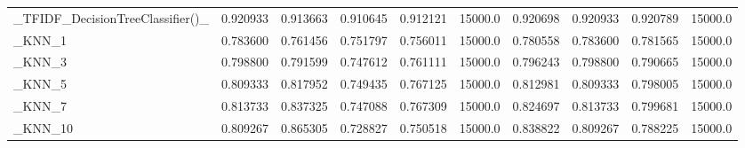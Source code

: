 \begin{tabular}{lrrrrrrrrr}
\_TFIDF\_DecisionTreeClassifier()\_                   &  0.920933 &         0.913663 &      0.910645 &        0.912121 &        15000.0 &            0.920698 &         0.920933 &           0.920789 &           15000.0 \\
\_KNN\_1                                             &  0.783600 &         0.761456 &      0.751797 &        0.756011 &        15000.0 &            0.780558 &         0.783600 &           0.781565 &           15000.0 \\
\_KNN\_3                                             &  0.798800 &         0.791599 &      0.747612 &        0.761111 &        15000.0 &            0.796243 &         0.798800 &           0.790665 &           15000.0 \\
\_KNN\_5                                             &  0.809333 &         0.817952 &      0.749435 &        0.767125 &        15000.0 &            0.812981 &         0.809333 &           0.798005 &           15000.0 \\
\_KNN\_7                                             &  0.813733 &         0.837325 &      0.747088 &        0.767309 &        15000.0 &            0.824697 &         0.813733 &           0.799681 &           15000.0 \\
\_KNN\_10                                            &  0.809267 &         0.865305 &      0.728827 &        0.750518 &        15000.0 &            0.838822 &         0.809267 &           0.788225 &           15000.0 \\
\bottomrule
\end{tabular}
